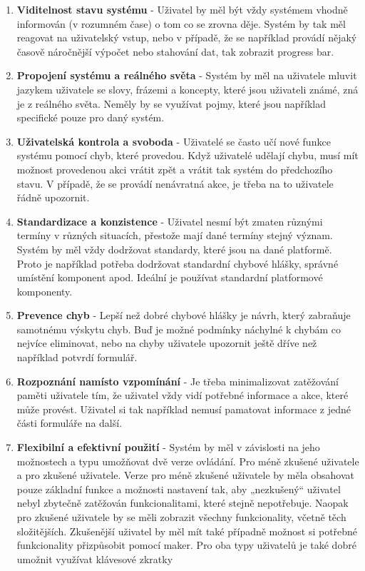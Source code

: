 \documentclass[thesis=M,czech]{FITthesis}[2012/06/26]
\begin{document}
\begin{enumerate}
	\item
	\textbf{Viditelnost stavu systému} - Uživatel by měl být vždy systémem vhodně informován (v rozumném čase)
	o tom co se zrovna děje. Systém by tak měl reagovat na uživatelský vstup, nebo v případě, že se například provádí nějaký časově náročnější výpočet nebo
	stahování dat, tak zobrazit progress bar.
	\item
	\textbf{Propojení systému a reálného světa} - Systém by měl na uživatele mluvit jazykem uživatele se slovy, frázemi a koncepty, které jsou uživateli známé, zná je z reálného světa. Neměly by se využívat
	pojmy, které jsou například specifické pouze pro daný systém.
	\item
	\textbf{Uživatelská kontrola a svoboda} - Uživatelé se často učí nové funkce systému pomocí chyb, které provedou. Když uživatelé udělají chybu, musí mít možnost provedenou akci vrátit zpět a vrátit
	tak systém do předchozího stavu. V případě, že se provádí nenávratná akce,
	je třeba na to uživatele řádně upozornit.
	\item
	\textbf{Standardizace a konzistence} - Uživatel nesmí být zmaten různými termíny v různých situacích, přestože mají dané termíny stejný význam. Systém by měl vždy dodržovat standardy, které
	jsou na dané platformě. Proto je například potřeba dodržovat standardní chybové
	hlášky, správné umístění komponent apod. Ideální je používat standardní
	platformové komponenty.
	\item
	\textbf{Prevence chyb} - Lepší než dobré chybové hlášky je návrh, který zabraňuje samotnému výskytu
	chyb. Buď je možné podmínky náchylné k chybám co nejvíce eliminovat, nebo
	na chyby uživatele upozornit ještě dříve než například potvrdí formulář.
	\item
	\textbf{Rozpoznání namísto vzpomínání} - Je třeba minimalizovat zatěžování paměti uživatele tím, že uživatel vždy vidí potřebné informace a akce, které může provést. Uživatel si tak například nemusí
	pamatovat informace z jedné části formuláře na další.
	\item
	\textbf{Flexibilní a efektivní použití} - Systém by měl v závislosti na jeho možnostech a typu umožňovat dvě verze ovládání. Pro méně zkušené uživatele a pro zkušené uživatele. Verze pro méně zkušené uživatele by měla obsahovat pouze základní funkce a možnosti nastavení tak, aby „nezkušený“ uživatel nebyl zbytečně zatěžován funkcionalitami, které stejně nepotřebuje. Naopak pro zkušené uživatele by se	měli zobrazit všechny funkcionality, včetně těch složitějších. Zkušenější uživatel by měl mít také případně možnost si potřebné funkcionality přizpůsobit pomocí maker. Pro oba typy uživatelů je také dobré umožnit využívat klávesové zkratky

\end{enumerate}
\end{document}

